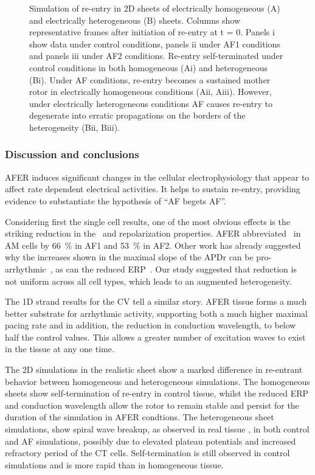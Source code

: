 \begin{figure}[t]
\centering
\caption[AFER 2D re-entry plots]{Simulation of re-entry in 2D sheets of electrically homogeneous
(A) and electrically heterogeneous (B) sheets.  Columns show
representative frames after initiation of re-entry at t = 0.  Panels i
show data under control conditions, panels ii under AF1 conditions and
panels iii under AF2 conditions.  Re-entry self-terminated under control
conditions in both homogeneous (Ai) and heterogeneous (Bi).  Under AF
conditions, re-entry becomes a sustained mother rotor in
electrically homogeneous conditions (Aii, Aiii).  However, under
electrically heterogeneous conditions AF causes re-entry to degenerate
into erratic propagations on the borders of the heterogeneity (Bii,
Biii).}
\label{fig:plots}
\end{figure}

\subsubsection{Discussion and conclusions}

AFER induces significant changes in the cellular electrophysiology that
appear to affect rate dependent electrical activities.  It helps to
sustain re-entry, providing evidence to substantiate the hypothesis of
``AF begets AF''.

Considering first the single cell results, one of the most obvious
effects is the striking reduction in the \apd\ and repolarization
properties.  AFER abbreviated \apd\ in AM cells by 66~\% in AF1 and
53~\% in AF2.  Other work has already suggested why the increases shown
in the maximal slope of the APDr can be
pro-arrhythmic~\cite{ByungSoo2002}, as can the reduced
ERP~\cite{Xie2002}.  Our study suggested that reduction is not uniform
across all cell types, which leads to an augmented heterogeneity.

The 1D strand results for the CV tell a similar story.  AFER tissue
forms a much better substrate for arrhythmic activity, supporting both a
much higher maximal pacing rate and in addition, the reduction in
conduction wavelength, to below half the control values. This allows a
greater number of excitation waves to exist in the tissue at any one
time.

The 2D simulations in the realistic sheet show a marked difference in
re-entrant behavior between homogeneous and heterogeneous simulations.
The homogeneous sheets show self-termination of re-entry in control
tissue, whilst the reduced ERP and conduction wavelength allow the rotor
to remain stable and persist for the duration of the simulation in AFER
condtions.  The heterogeneous sheet simulations, show spiral wave
breakup, as observed in real tissue \cite{Kumagai1997}, in both control
and AF simulations, possibly due to elevated plateau potentials and
increased refractory period of the CT cells.  Self-termination is still
observed in control simulations and is more rapid than in homogeneous
tissue.

